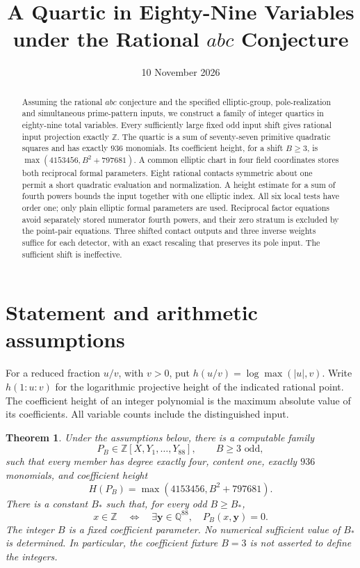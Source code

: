 \documentclass[11pt,a4paper]{article}
\title{A Quartic in Eighty-Nine Variables under the Rational $abc$ Conjecture}
\author{}\date{10 November 2026}
\newtheorem{theorem}{Theorem}[section]
\newcommand{\Q}{\mathbb Q}\newcommand{\Z}{\mathbb Z}
\begin{document}
\maketitle
\begin{abstract}
Assuming the rational $abc$ conjecture and the specified elliptic-group,
pole-realization and simultaneous prime-pattern inputs, we construct a
family of integer quartics in eighty-nine total variables. Every
sufficiently large fixed odd input shift gives rational input projection
exactly $\Z$. The quartic is a sum of seventy-seven primitive quadratic
squares and has exactly $936$ monomials. Its coefficient height, for a
shift $B\ge3$, is $\max(4153456,B^2+797681)$. A common elliptic chart in four field coordinates stores both reciprocal
formal parameters. Eight rational contacts symmetric about one permit a short quadratic evaluation and normalization.
A height estimate for a sum of fourth powers bounds the input together
with one elliptic index. All six local tests have order one; only plain
elliptic formal parameters are used. Reciprocal factor equations
avoid separately stored numerator fourth powers, and their zero stratum
is excluded by the point-pair equations. Three shifted contact outputs
and three inverse weights suffice for each detector, with an exact
rescaling that preserves its pole input. The sufficient shift is ineffective.
\end{abstract}

\section{Statement and arithmetic assumptions}

For a reduced fraction $u/v$, with $v>0$, put
$h(u/v)=\log\max(|u|,v)$. Write $h(1:u:v)$ for the logarithmic
projective height of the indicated rational point. The coefficient height
of an integer polynomial is the maximum absolute value of its coefficients.
All variable counts include the distinguished input.

\begin{theorem}\label{thm:main}
Under the assumptions below, there is a computable family
\[
 P_B\in\Z[X,Y_1,\ldots,Y_{88}],\qquad B\ge3\text{ odd},
\]
such that every member has degree exactly four, content one, exactly
$936$ monomials, and coefficient height
\[
 H(P_B)=\max(4153456,B^2+797681).
\]
There is a constant $B_*$ such that, for every odd $B\ge B_*$,
\[
 x\in\Z\quad\Longleftrightarrow\quad
 \exists\boldsymbol y\in\Q^{88},\quad P_B(x,\boldsymbol y)=0.
\]
The integer $B$ is a fixed coefficient parameter. No numerical sufficient
value of $B_*$ is determined. In particular, the coefficient fixture
$B=3$ is not asserted to define the integers.
\end{theorem}
\end{document}
